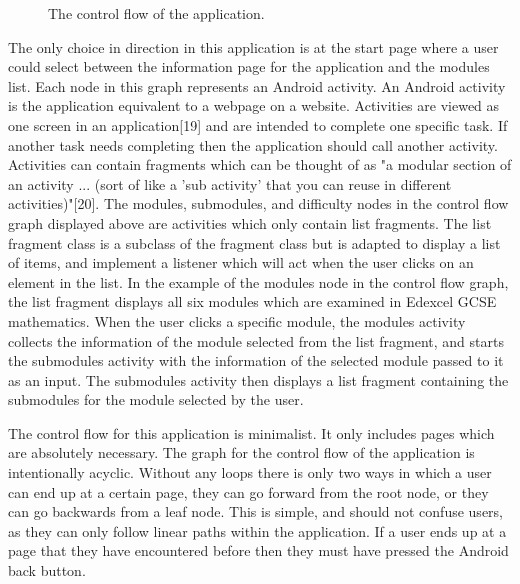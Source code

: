 \documentclass{article}
\begin{document}
\begin{figure}[H]
	\centering
	\caption{The control flow of the application.}
	\label{figure:applicationControlFlow}
\end{figure}

The only choice in direction in this application is at the start page where a user could select between the information page for the application and the modules list. Each node in this graph represents an Android activity. An Android activity is the application equivalent to a webpage on a website. Activities are viewed as one screen in an application[19] and are intended to complete one specific task. If another task needs completing then the application should call another activity. Activities can contain fragments which can be thought of as "a modular section of an activity ... (sort of like a 'sub activity' that you can reuse in different activities)"[20]. The modules, submodules, and difficulty nodes in the control flow graph displayed above are activities which only contain list fragments. The list fragment class is a subclass of the fragment class but is adapted to display a list of items, and implement a listener which will act when the user clicks on an element in the list. In the example of the modules node in the control flow graph, the list fragment displays all six modules which are examined in Edexcel GCSE mathematics. When the user clicks a specific module, the modules activity collects the information of the module selected from the list fragment, and starts the submodules activity with the information of the selected module passed to it as an input. The submodules activity then displays a list fragment containing the submodules for the module selected by the user. \par

The control flow for this application is minimalist. It only includes pages which are absolutely necessary. The graph for the control flow of the application is intentionally acyclic. Without any loops there is only two ways in which a user can end up at a certain page, they can go forward from the root node, or they can go backwards from a leaf node. This is simple, and should not confuse users, as they can only follow linear paths within the application. If a user ends up at a page that they have encountered before then they must have pressed the Android back button. \par
\end{document}
